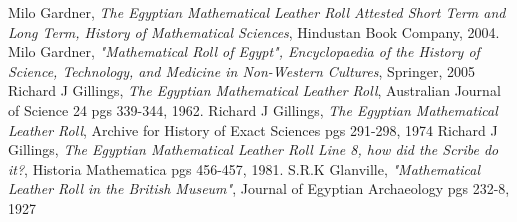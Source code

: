 \documentclass[12pt]{article}
\begin{document}
\begin{thebibliography}{6}
 Milo Gardner, \emph{The Egyptian Mathematical Leather Roll Attested Short Term and Long Term, History of Mathematical Sciences}, Hindustan Book Company, 2004.
Milo Gardner, \emph{"Mathematical Roll of Egypt", Encyclopaedia of the History of Science, Technology, and Medicine in Non-Western Cultures}, Springer, 2005
 Richard J Gillings, \emph{The Egyptian Mathematical Leather Roll}, Australian Journal of Science 24 pgs 339-344, 1962.
 Richard J Gillings, \emph{The Egyptian Mathematical Leather Roll}, Archive for History of Exact Sciences pgs 291-298, 1974
 Richard J Gillings, \emph{The Egyptian Mathematical Leather Roll Line 8, how did the Scribe do it?}, Historia Mathematica pgs 456-457, 1981.
S.R.K Glanville, \emph{"Mathematical Leather Roll in the British Museum"}, Journal of Egyptian Archaeology pgs 232-8, 1927
\end{thebibliography}

\end{document}
